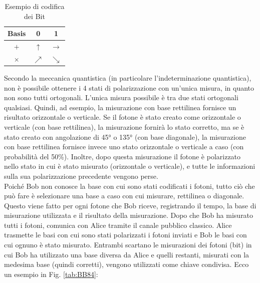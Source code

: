 \begin{table}[H]
\centering
    \begin{tabular}{|c|c|c|}
    \hline
    Basis & 0 & 1\\
    \hline
    $+$ & $\uparrow$ & $\rightarrow$\\
    \hline
    $\times$ & $\nearrow$ & $\searrow$\\
    \hline
    \end{tabular}
    \caption{Esempio di codifica dei Bit}
    \label{tab:codifica_bit}
\end{table}
\noindent Secondo la meccanica quantistica (in particolare l'indeterminazione quantistica), non è possibile ottenere i 4 stati di polarizzazione con un'unica misura, in quanto non sono tutti ortogonali. L'unica misura possibile è tra due stati ortogonali qualsiasi. Quindi, ad esempio, la misurazione con base rettilinea fornisce un risultato orizzontale o verticale. Se il fotone è stato creato come orizzontale o verticale (con base rettilinea), la misurazione fornirà lo stato corretto, ma se è stato creato con angolazione di 45° o 135° (con base diagonale), la misurazione con base rettilinea fornisce invece uno stato orizzontale o verticale a caso (con probabilità del 50\%). Inoltre, dopo questa misurazione il fotone è polarizzato nello stato in cui è stato misurato (orizzontale o verticale), e tutte le informazioni sulla sua polarizzazione precedente vengono perse.\\
Poiché Bob non conosce la base con cui sono stati codificati i fotoni, tutto ciò che può fare è selezionare una base a caso con cui misurare, rettilinea o diagonale. Questo viene fatto per ogni fotone che Bob riceve, registrando il tempo, la base di misurazione utilizzata e il risultato della misurazione. Dopo che Bob ha misurato tutti i fotoni, comunica con Alice tramite il canale pubblico classico. Alice trasmette le basi con cui sono stati polarizzati i fotoni inviati e Bob le basi con cui ognuno è stato misurato. Entrambi scartano le misurazioni dei fotoni (bit) in cui Bob ha utilizzato una base diversa da Alice e quelli restanti, misurati con la medesima base (quindi corretti), vengono utilizzati come chiave condivisa. Ecco un esempio in Fig. \ref{tab:BB84}:
\setlength\doublerulesep{0.3cm} 
